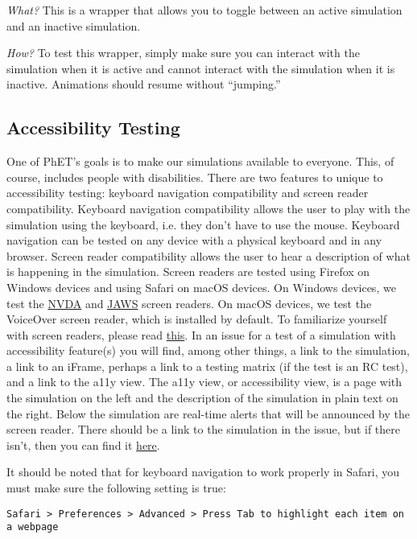 \documentclass[titlepage]{article}
\begin{document}
\textit{What?} This is a wrapper that allows you to toggle between an active simulation and an inactive simulation.

\textit{How?} To test this wrapper, simply make sure you can interact with the simulation when it is active and cannot interact with the simulation when it is inactive. Animations should resume without ``jumping.''

	\subsection{Accessibility Testing}
	
One of PhET's goals is to make our simulations available to everyone. This, of course, includes people with disabilities. There are two features to unique to accessibility testing: keyboard navigation compatibility and screen reader compatibility. Keyboard navigation compatibility allows the user to play with the simulation using the keyboard, i.e. they don't have to use the mouse. Keyboard navigation can be tested on any device with a physical keyboard and in any browser. Screen reader compatibility allows the user to hear a description of what is happening in the simulation. Screen readers are tested using Firefox on Windows devices and using Safari on macOS devices. On Windows devices, we test the \href{https://www.nvaccess.org/}{NVDA} and \href{http://www.freedomscientific.com/Products/Blindness/JAWS}{JAWS} screen readers. On macOS devices, we test the VoiceOver screen reader, which is installed by default. To familiarize yourself with screen readers, please read \href{https://bayes.colorado.edu/dev/html/jg-tests/reader-intro.html}{this}. In an issue for a test of a simulation with accessibility feature(s) you will find, among other things, a link to the simulation, a link to an iFrame, perhaps a link to a testing matrix (if the test is an RC test), and a link to the a11y view. The a11y view, or accessibility view, is a page with the simulation on the left and the description of the simulation in plain text on the right. Below the simulation are real-time alerts that will be announced by the screen reader. There should be a link to the simulation in the issue, but if there isn't, then you can find it \href{https://phet-dev.colorado.edu/html/}{here}.

It should be noted that for keyboard navigation to work properly in Safari, you must make sure the following setting is true:

\verb|Safari > Preferences > Advanced > Press Tab to highlight each item on a webpage|
\end{document}
